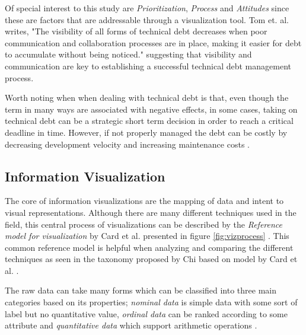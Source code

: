 Of special interest to this study are \textit{Prioritization}, \textit{Process} and \textit{Attitudes} since these are factors that are addressable through a visualization tool.
Tom et. al. writes, "The visibility of all forms of technical debt decreases when poor communication and collaboration processes are in place, making it easier for debt to accumulate without being noticed." \cite{tom_exploration_2013} suggesting that visibility and communication are key to establishing a successful technical debt management process.

Worth noting when when dealing with technical debt is that, even though the term in many ways are associated with negative effects, in some cases, taking on technical debt can be a strategic short term decision in order to reach a critical deadline in time.
However, if not properly managed the debt can be costly by decreasing development velocity and increasing maintenance costs \cite{seaman_using_2012}.

\subsection{Information Visualization}
The core of information visualizations are the mapping of data and intent to visual representations.
Although there are many different techniques used in the field, this central process of visualizations can be described by the \textit{Reference model for visualization} by Card et al. presented in figure \ref{fig:vizprocess} \cite{card_readings_1999}.
This common reference model is helpful when analyzing and comparing the different techniques as seen in the taxonomy proposed by Chi based on model by Card et al. \cite{chi_taxonomy_2000}.



The raw data can take many forms which can be classified into three main categories based on its properties; \textit{nominal data} is simple data with some sort of label but no quantitative value, \textit{ordinal data} can be ranked according to some attribute and \textit{quantitative data} which support arithmetic operations \cite{card_structure_1997}.


